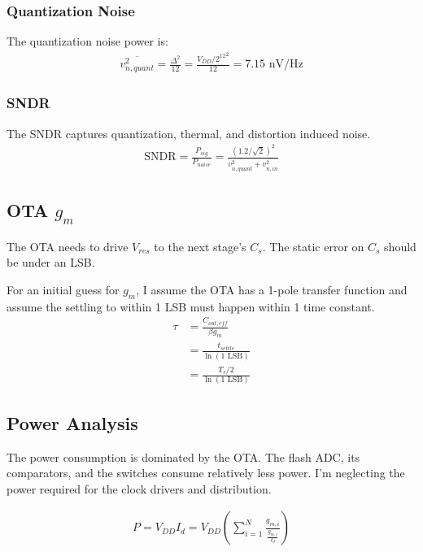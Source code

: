 \documentclass[11pt]{article}
\begin{document}
\subsubsection{Quantization Noise}
The quantization noise power is:
\begin{align*}
  \overline{v^2_{n,quant}} = \frac{\Delta^2}{12} = \frac{{V_{DD} / 2^{12}}^2}{12} = 7.15 \text{ nV/Hz}
\end{align*}

\subsubsection{SNDR}
The SNDR captures quantization, thermal, and distortion induced noise.
\begin{align*}
  \text{SNDR} = \frac{P_{sig}}{P_{noise}} = \frac{(1.2 / \sqrt{2})^2}{\overline{v^2_{n,quant}} + \overline{v^2_{n,in}}}
\end{align*}

\subsection{OTA $g_m$} %
The OTA needs to drive $V_{res}$ to the next stage's $C_s$.
The static error on $C_s$ should be under an LSB.

For an initial guess for $g_m$, I assume the OTA has a 1-pole transfer function and assume the settling to within 1 LSB must happen within 1 time constant.
\begin{align*}
  \tau &= \frac{C_{out,eff}}{\beta g_m} \\
       &= \frac{t_{settle}}{\ln (\text{1 LSB})} \\
       &= \frac{T_s / 2}{\ln (\text{1 LSB})}
\end{align*}

\subsection{Power Analysis} %
The power consumption is dominated by the OTA.
The flash ADC, its comparators, and the switches consume relatively less power.
I'm neglecting the power required for the clock drivers and distribution.

\begin{align*}
  P = V_{DD} I_{d} = V_{DD} \left( \sum_{i=1}^{N} \frac{g_{m,i}}{\frac{g_{m,i}}{I_d}} \right)
\end{align*}
\end{document}
